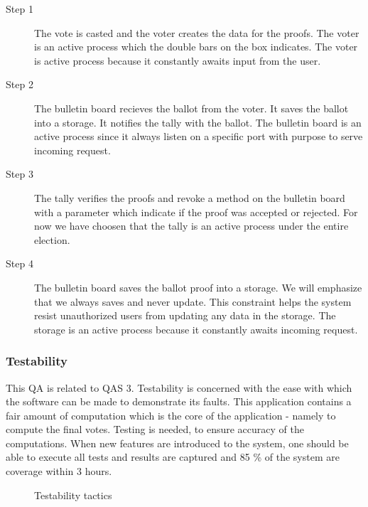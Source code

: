 \begin{description}
    \item[Step 1] The vote is casted and the voter creates the data for the proofs. The voter is an active process which the double bars on the box indicates. The voter is active process because it constantly awaits input from the user.  

    \item[Step 2] The bulletin board recieves the ballot from the voter. It saves the ballot into a storage. It notifies the tally with the ballot. The bulletin board is an active process since it always listen on a specific port with purpose to serve incoming request.   
    
    \item[Step 3] The tally verifies the proofs and revoke a method on the bulletin board with a parameter which indicate if the proof was accepted or rejected. For now we have choosen that the tally is an active process under the entire election. 
    
    \item[Step 4] The bulletin board saves the ballot proof into a storage. We will emphasize that we always saves and never update. This constraint helps the system resist unauthorized users from updating any data in the storage. The storage is an active process because it constantly awaits incoming request.  

\end{description}


\subsubsection{Testability}
This QA is related to QAS 3. Testability is concerned with the ease with which the software can be made to demonstrate its faults. This application contains a fair amount of computation which is the core of the application - namely to compute the final votes. Testing is needed, to ensure accuracy of the computations. When new features are introduced to the system, one should be able to execute all tests and results are captured and 85 \% of the system are coverage within 3 hours.


\begin{figure}[H]
\centering
  \caption{Testability tactics \cite{Bass}}   
\end{figure}



